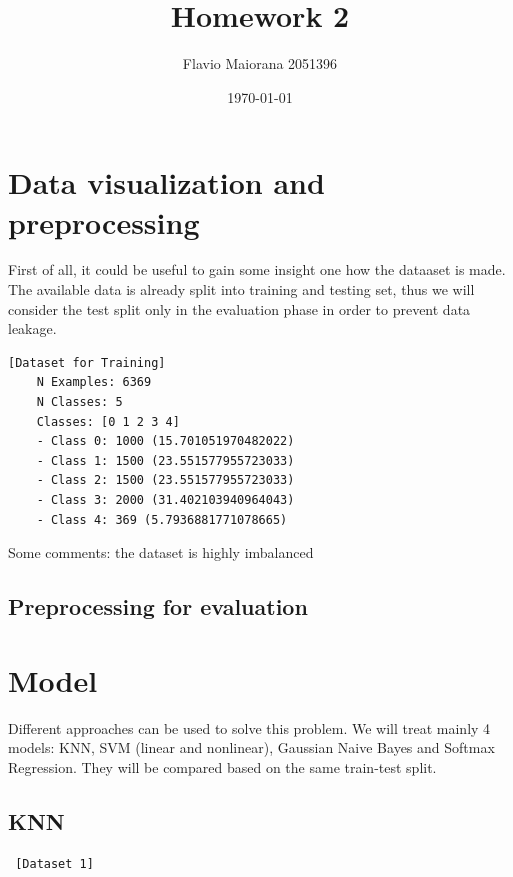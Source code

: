\documentclass[12pt,a4paper,oneside]{article}
\title{Homework 2}	                                    %
\author{Flavio Maiorana 2051396}				        %
\date{\today}								            %
\begin{document}

\newpage


\section{Data visualization and preprocessing}

First of all, it could be useful to gain some insight one how the dataaset is
made. The available data is already split into training and testing set, thus we
will consider the test split only in the evaluation phase in order to prevent
data leakage.

\begin{verbatim}[Dataset for Training]
    N Examples: 6369
    N Classes: 5
    Classes: [0 1 2 3 4]
    - Class 0: 1000 (15.701051970482022)
    - Class 1: 1500 (23.551577955723033)
    - Class 2: 1500 (23.551577955723033)
    - Class 3: 2000 (31.402103940964043)
    - Class 4: 369 (5.7936881771078665)
\end{verbatim}

Some comments: the dataset is highly imbalanced

\newpage

\subsection{Preprocessing for evaluation}



\section{Model}

Different approaches can be used to solve this problem. We will treat mainly 4
models: KNN, SVM (linear and nonlinear), Gaussian Naive Bayes and Softmax
Regression. They will be compared based on the same train-test split.

\subsection{KNN}

\begin{verbatim} [Dataset 1]
\end{verbatim}
\end{document}
